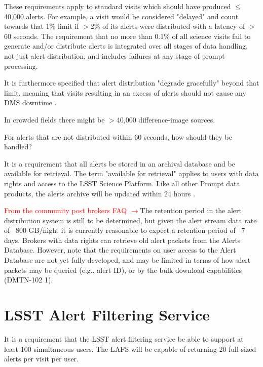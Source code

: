 \documentclass[DM,lsstdraft,authoryear,toc]{lsstdoc}
\begin{document}
These requirements apply to standard visits which should have produced $\leq$40,000 alerts. For example, a visit would be considered "delayed" and count towards that 1\% limit if $>$2\% of its alerts were distributed with a latency of $>$60 seconds. The requirement that no more than 0.1\% of all science visits fail to generate and/or distribute alerts is integrated over all stages of data handling, not just alert distribution, and includes failures at any stage of prompt processing.

It is furthermore specified that alert distribution "degrade gracefully" beyond that limit, meaning that visits resulting in an excess of alerts should not cause any DMS downtime .


In crowded fields there might be $>$40,000 difference-image sources.

For alerts that are not distributed within 60 seconds, how should they be handled? 

It is a requirement that all alerts be stored in an archival database and be available for retrieval. The term "available for retrieval" applies to users with data rights and access to the LSST Science Platform. Like all other Prompt data products, the alerts archive will be updated within 24 hours .

\textcolor{red}{From the community post brokers FAQ $\rightarrow$}The retention period in the alert distribution system is still to be determined, but given the alert stream data rate of ~800 GB/night it is currently reasonable to expect a retention period of ~7 days. Brokers with data rights can retrieve old alert packets from the Alerts Database. However, note that the requirements on user access to the Alert Database are not yet fully developed, and may be limited in terms of how alert packets may be queried (e.g., alert ID), or by the bulk download capabilities (DMTN-102 1).



\clearpage
\section{LSST Alert Filtering Service}\label{sec:lafs}

It is a requirement that the LSST alert filtering service be able to support at least 100 simultaneous users. The LAFS will be capable of returning 20 full-sized alerts per visit per user.
\end{document}
